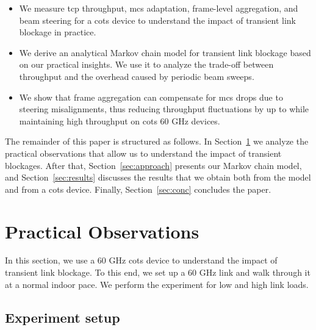 \documentclass{article}
\begin{document}
\begin{itemize}

	\item We measure \ac{tcp} throughput, \ac{mcs} adaptation, frame-level aggregation, and beam steering for a \ac{cots} device to understand the impact of transient link blockage in practice.
	\item We derive an analytical Markov chain model for transient link blockage based on our practical insights. We use it to analyze the trade-off between throughput and the overhead caused by periodic beam sweeps.	
	\item We show that frame aggregation can compensate for \ac{mcs} drops due to steering misalignments, thus reducing throughput fluctuations by up to  while maintaining high throughput on \ac{cots} 60 GHz devices.
\end{itemize}

The remainder of this paper is structured as follows. In Section~\ref{sec:problem} we analyze the practical observations that allow us to understand the impact of transient blockages. After that, Section~\ref{sec:approach} presents our Markov chain model, and Section~\ref{sec:results} discusses the results that we obtain both from the model and from a \ac{cots} device. Finally, Section~\ref{sec:conc} concludes the paper.



\section{Practical Observations}
\label{sec:problem}

In this section, we use a 60 GHz \ac{cots} device to understand the impact of transient link blockage. To this end, we set up a 60 GHz link and walk through it at a normal indoor pace. We perform the experiment for low and high link loads.

\subsection{Experiment setup}
\label{subsec:observations}
\end{document}
